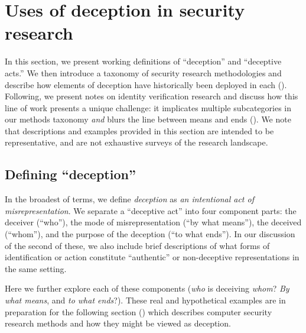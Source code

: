 \section{Uses of deception in security research}
\label{sec:methods}

In this section, we present working definitions of ``deception'' and ``deceptive acts.'' We then introduce a taxonomy of security research methodologies and describe how elements of deception have historically been deployed in each (). Following, we present notes on identity verification research and discuss how this line of work presents a unique challenge: it implicates multiple subcategories in our methods taxonomy \textit{and} blurs the line between means and ends (). We note that descriptions and examples provided in this section are intended to be representative, and are not exhaustive surveys of the research landscape. 




\subsection{Defining ``deception''}
\label{sec:def-deception}

In the broadest of terms, we define \textit{deception} as \textit{an intentional act of misrepresentation}. 
We separate a ``deceptive act'' into four component parts: the deceiver (``who''), the mode of misrepresentation (``by what means''), the deceived (``whom''), and the purpose of the deception (``to what ends''). In our discussion of the second of these, we also include brief descriptions of what forms of identification or action constitute ``authentic'' or non-deceptive representations in the same setting. 
\newline

\noindent{}
\newline

Here we further explore each of these components (\textit{who} is deceiving \textit{whom}? \textit{By what means}, and \textit{to what ends}?). These real and hypothetical examples are in preparation for the following section () which describes computer security research methods and how they might be viewed as deception.

